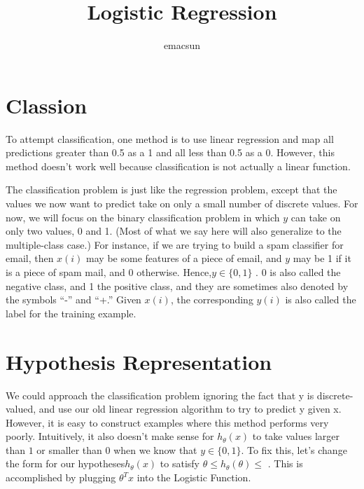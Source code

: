\documentclass[10pt,a4paper,UTF8]{article}
\author{emacsun}
\date{}
\title{Logistic Regression}
\begin{document}
\maketitle
\tableofcontents
{}
\section{Classion}
\label{sec:orgdfc78c2}


To attempt classification, one method is to use linear regression and map all predictions greater than 0.5 as a 1 and all less than 0.5 as a 0. However, this method doesn't work well because classification is not actually a linear function.

The classification problem is just like the regression problem, except that the values we now want to predict take on only a small number of discrete values. For now, we will focus on the binary classification problem in which \(y\) can take on only two values, 0 and 1. (Most of what we say here will also generalize to the multiple-class case.) For instance, if we are trying to build a spam classifier for email, then \(x(i)\) may be some features of a piece of email, and \(y\) may be 1 if it is a piece of spam mail, and 0 otherwise. Hence,\(y\in \{0,1\}\) . 0 is also called the negative class, and 1 the positive class, and they are sometimes also denoted by the symbols “-” and “+.” Given \(x(i)\), the corresponding \(y(i)\) is also called the label for the training example.
\section{Hypothesis Representation}
\label{sec:orgee060ef}


We could approach the classification problem ignoring the fact that y is discrete-valued, and use our old linear regression algorithm to try to predict y given x. However, it is easy to construct examples where this method performs very poorly. Intuitively, it also doesn't make sense for \(h_{\theta}(x)\)  to take values larger than \(1\) or smaller than \(0\) when we know that \(y\in \{0,1\}\). To fix this, let's change the form for our hypotheses\(h_{\theta}(x)\)  to satisfy \(\theta \leq h_{\theta}(\theta) \leq\) . This is accomplished by plugging \(\theta^{T}x\)  into the Logistic Function.
\end{document}
